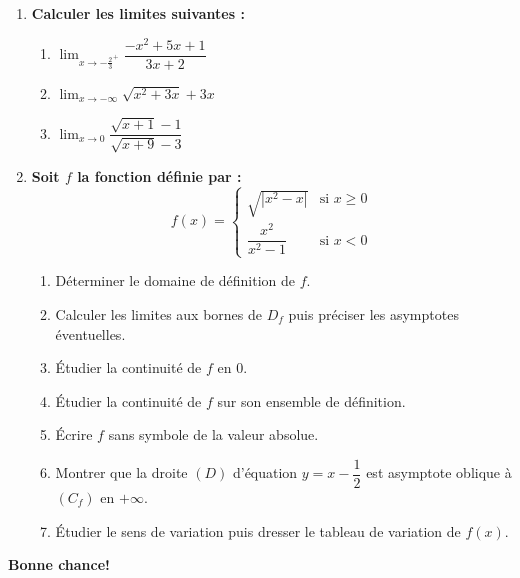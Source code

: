 \documentclass[12pt,a4paper]{article}
\begin{document}
\begin{enumerate}
    \item \textbf{Calculer les limites suivantes :}
    \begin{enumerate}
        \item $\lim_{x\rightarrow-\frac{2}{3}^{+}}\dfrac{-x^{2}+5x+1}{3x+2}$
        \item $\lim_{x\rightarrow-\infty}\sqrt{x^{2}+3x}+3x$
        \item $\lim_{x\rightarrow0}\dfrac{\sqrt{x+1}-1}{\sqrt{x+9}-3}$
    \end{enumerate}
    
    \item \textbf{Soit $f$ la fonction définie par :}
    \[ f(x)=\begin{cases}
    \sqrt{|x^{2}-x|} & \text{si } x\ge0 \\ 
    \dfrac{x^{2}}{x^{2}-1} & \text{si } x<0
    \end{cases} \]
    
    \begin{enumerate}
        \item Déterminer le domaine de définition de $f$.
        \item Calculer les limites aux bornes de $D_{f}$ puis préciser les asymptotes éventuelles.
        \item Étudier la continuité de $f$ en 0.
        \item Étudier la continuité de $f$ sur son ensemble de définition.
        \item Écrire $f$ sans symbole de la valeur absolue.
        \item Montrer que la droite $(D)$ d'équation $y=x-\dfrac{1}{2}$ est asymptote oblique à $(C_{f})$ en $+\infty$.
        \item Étudier le sens de variation puis dresser le tableau de variation de $f(x)$.
    \end{enumerate}
\end{enumerate}

\begin{center}
    \textbf{Bonne chance!}
\end{center}
\end{document}

